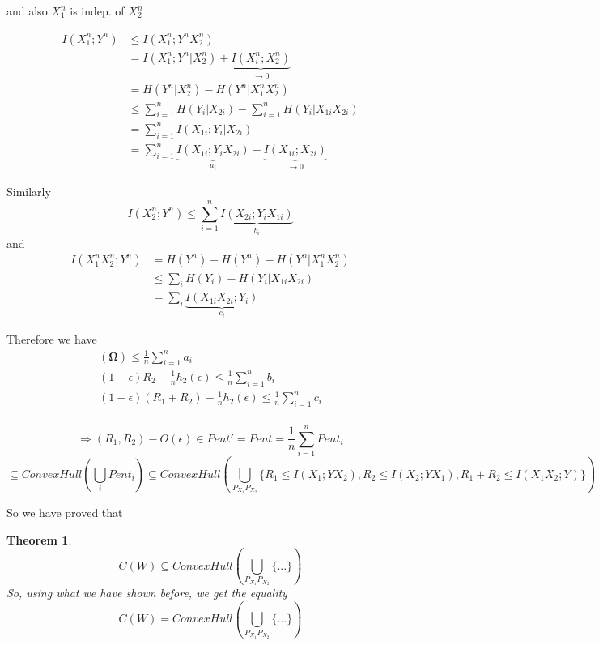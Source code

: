 \documentclass[twoside]{article}
\newtheorem{theorem}{Theorem}[section]
\theoremstyle{definition} %
\begin{document}
and also $X_1^n$ is indep. of $X_2^n$

\begin{align*}
  I(X_1^n ; Y^n) &\leq I(X_1^n ; Y^n X_2^n) \\
                 &= I(X_1^n ; Y^n | X_2^n) + \underbrace{I(X_i^n ; X_2^n)}_{\to 0} \\
                 &= H(Y^n | X_2^n) - H(Y^n | X_1^n X_2^n) \\
                 &\leq \sum_{i = 1}^n H(Y_i | X_{2i}) - \sum_{i = 1}^n H(Y_i | X_{1i} X_{2i}) \\
                 &= \sum_{i = 1}^n I(X_{1i} ; Y_i | X_{2i}) \\
                 &= \sum_{i = 1}^n \underbrace{I(X_{1i} ; Y_i X_{2i})}_{a_i} - \underbrace{I(X_{1i} ; X_{2i})}_{\to 0}
\end{align*}

Similarly
\[
  I(X_2^n ; Y^n) \leq \sum_{i = 1}^n \underbrace{I(X_{2i} ; Y_i X_{1i})}_{b_i}
\]
and
\begin{align*}
  I(X_1^n X_2^n ; Y^n) &= H(Y^n) - H(Y^n) - H(Y^n | X_1^n X_2^n ) \\
                       &\leq \sum_i H(Y_i) - H(Y_i | X_{1i} X_{2i}) \\
                       &= \sum_i \underbrace{I(X_{1i} X_{2i} ; Y_i)}_{c_i}
\end{align*}

Therefore we have
\begin{align*}
  \mathbf{(\Omega)} \leq \frac{1}{n} \sum_{i=1}^n a_i \\
  (1 - \epsilon) R_2 - \frac{1}{n} h_2(\epsilon) \leq \frac{1}{n} \sum_{i=1}^n b_i \\
  (1 - \epsilon) (R_1 + R_2) - \frac{1}{n} h_2(\epsilon) \leq \frac{1}{n} \sum_{i=1}^n c_i \\
\end{align*}

\[
  \Rightarrow (R_1, R_2) - O(\epsilon) \in Pent' = Pent = \frac{1}{n} \sum_{i=1}^n Pent_i
\]
\[
  \subseteq ConvexHull(\bigcup_i Pent_i) \subseteq ConvexHull(\bigcup_{P_{X_1} P_{X_2}} \{ R_1 \leq I(X_1 ; Y X_2),  R_2 \leq I(X_2 ; Y X_1),  R_1 + R_2 \leq I(X_1 X_2 ; Y)\})
\]

So we have proved that

\begin{theorem}
  \[
    C(W) \subseteq ConvexHull(\bigcup_{P_{X_1} P_{X_2}} \{...\})
  \]
  So, using what we have shown before, we get the equality
  \[
    C(W) = ConvexHull(\bigcup_{P_{X_1} P_{X_2}} \{...\})
  \]
\end{theorem}
\end{document}
